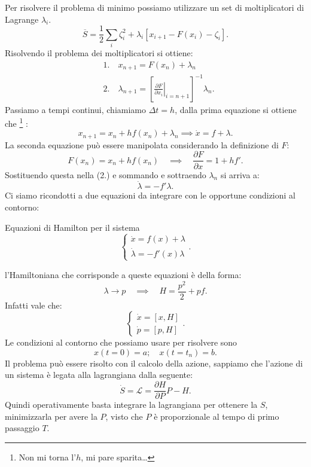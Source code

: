 Per risolvere il problema di minimo possiamo utilizzare un set di moltiplicatori di Lagrange $\lambda_i$.
\[
    \overline{S} = \frac{1}{2}\sum_{i}^{} \zeta^2_i + \lambda_i \left[x_{i+1}-F(x_i)- \zeta_i\right]
.\] 
Risolvendo il problema dei moltiplicatori si ottiene:
\[\begin{aligned}
    &1. \quad x_{n+1} = F(x_n) + \lambda_n\\
    &2. \quad \lambda_{n+1}=\left[\left.\frac{\partial F}{\partial x_i} \right|_{i = n+1}\right]^{-1}\lambda_n
.\end{aligned}\]
Passiamo a tempi continui, chiamiamo $\Delta t = h$, dalla prima equazione si ottiene che
\footnote{Non mi torna l'$h$, mi pare sparita\ldots}
:
\[
    x_{n+1} = x_n + h f(x_n) + \lambda_n \implies  \dot{x} = f + \lambda
.\] 
La seconda equazione può essere manipolata considerando la definizione di $F$:
\[
    F(x_n) = x_n+hf(x_n) \quad \implies  \quad  \frac{\partial F}{\partial x} = 1+hf'
.\] 
Sostituendo questa nella (2.) e sommando e sottraendo $\lambda_n$ si arriva a:
\[
    \dot{\lambda} =  - f'\lambda
.\] 
Ci siamo ricondotti a due equazioni da integrare con le opportune condizioni al contorno:
\begin{redbox}{Equazioni di Hamilton per il sistema}
\[
    \begin{cases}
	\dot{x} = f(x) + \lambda\\
	\dot{\lambda } = - f'(x) \lambda
    \end{cases}
.\]     
\end{redbox}
\noindent
l'Hamiltoniana che corrisponde a queste equazioni è della forma:
\[
    \lambda  \to p \quad \implies  \quad H = \frac{p^2}{2} + pf
.\] 
Infatti vale che:
\[
    \begin{cases}
	\dot{x} = \left[x,H\right]\\
	\dot{p} = \left[p,H\right]
    \end{cases}
.\] 
Le condizioni al contorno che possiamo usare per risolvere sono 
\[
    x(t=0) = a; \quad x(t = t_n) = b
.\] 
Il problema può essere risolto con il calcolo della azione, sappiamo che l'azione di un sistema è legata alla lagrangiana dalla seguente:
\[
    \dot{S} = \mathcal{L} = \frac{\partial H}{\partial P} P - H
.\] 
Quindi operativamente basta integrare la lagrangiana per ottenere la $S$, minimizzarla per avere la $P$, visto che $P$ è proporzionale al tempo di primo passaggio $T$. 
